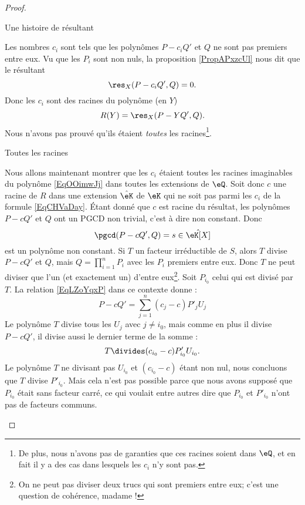 \begin{proof}
\begin{subproof}
\item[Une histoire de résultant]

    Les nombres \( c_i\) sont tels que les polynômes \( P-c_iQ'\) et \( Q\) ne sont pas premiers entre eux. Vu que les \( P_i\) sont non nuls, la proposition \ref{PropAPxzcUl} nous dit que le résultant
    \begin{equation}
        \res_X(P-c_iQ',Q)=0.
    \end{equation}
    Donc les \( c_i\) sont des racines du polynôme (en \( Y\))
    \begin{equation}    \label{EqOOimwJj}
        R(Y)=\res_X(P-YQ',Q).
    \end{equation}
    Nous n'avons pas prouvé qu'ils étaient \emph{toutes} les racines\footnote{De plus, nous n'avons pas de garanties que ces racines soient dans \( \eQ\), et en fait il y a des cas dans lesquels les \( c_i\) n'y sont pas.}.

\item[Toutes les racines]

    Nous allons maintenant montrer que les \( c_i\) étaient toutes les racines imaginables du polynôme \eqref{EqOOimwJj} dans toutes les extensions de \( \eQ\). Soit donc \( c\) une racine de \( R\) dans une extension \( \hat \eK\) de \( \eK\) qui ne soit pas parmi les \( c_i\) de la formule \eqref{EqCHVaDay}. Étant donné que \( c\) est racine du résultat, les polynômes \( P-cQ'\) et \( Q\) ont un PGCD non trivial, c'est à dire non constant. Donc
    \begin{equation}
        \pgcd(P-cQ',Q)=s\in \hat\eK[X]
    \end{equation}
    est un polynôme non constant. Si \( T\) un facteur irréductible de \( S\), alors \( T\) divise \( P-cQ'\) et \( Q\), mais \( Q=\prod_{i=1}^nP_i\) avec les \( P_i\) premiers entre eux. Donc \( T\) ne peut diviser que l'un (et exactement un) d'entre eux\footnote{On ne peut pas diviser deux trucs qui sont premiers entre eux; c'est une question de cohérence, madame !}. Soit \( P_{i_0}\) celui qui est divisé par \( T\). La relation \eqref{EqLZoYqxP} dans ce contexte donne :
    \begin{equation}
        P-cQ'=\sum_{j=1}^n(c_j-c)P'_jU_j
    \end{equation}
    Le polynôme \( T\) divise tous les \( U_j\) avec \( j\neq i_0\), mais comme en plus il divise \( P-cQ'\), il divise aussi le dernier terme de la somme :
    \begin{equation}
        T\divides (c_{i_0}-c)P'_{i_0}U_{i_0}.
    \end{equation}
    Le polynôme \( T\) ne divisant pas \( U_{i_0}\) et \(  (c_{i_0}-c)  \) étant non nul, nous concluons que \( T\) divise \( P'_{i_0}\). Mais cela n'est pas possible parce que nous avons supposé que \( P_{i_0}\) était sans facteur carré, ce qui voulait entre autres dire que \( P_{i_0}\) et \( P'_{i_0}\) n'ont pas de facteurs communs.

    \end{subproof}
\end{proof}

